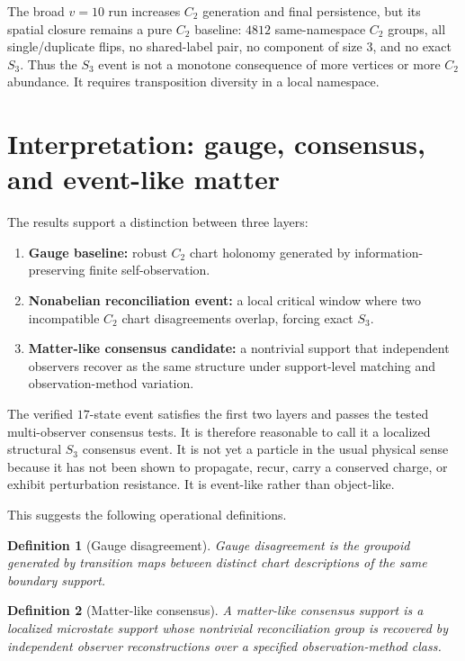 \documentclass[11pt]{article}
\newtheorem{definition}{Definition}
\begin{document}
The broad $v=10$ run increases $C_2$ generation and final persistence, but its spatial closure remains a pure $C_2$ baseline: $4812$ same-namespace $C_2$ groups, all single/duplicate flips, no shared-label pair, no component of size $3$, and no exact $S_3$.  Thus the $S_3$ event is not a monotone consequence of more vertices or more $C_2$ abundance.  It requires transposition diversity in a local namespace.

\section{Interpretation: gauge, consensus, and event-like matter}

The results support a distinction between three layers:

\begin{enumerate}
\item \textbf{Gauge baseline:} robust $C_2$ chart holonomy generated by information-preserving finite self-observation.
\item \textbf{Nonabelian reconciliation event:} a local critical window where two incompatible $C_2$ chart disagreements overlap, forcing exact $S_3$.
\item \textbf{Matter-like consensus candidate:} a nontrivial support that independent observers recover as the same structure under support-level matching and observation-method variation.
\end{enumerate}

The verified $17$-state event satisfies the first two layers and passes the tested multi-observer consensus tests.  It is therefore reasonable to call it a localized structural $S_3$ consensus event.  It is not yet a particle in the usual physical sense because it has not been shown to propagate, recur, carry a conserved charge, or exhibit perturbation resistance.  It is event-like rather than object-like.

This suggests the following operational definitions.

\begin{definition}[Gauge disagreement]
Gauge disagreement is the groupoid generated by transition maps between distinct chart descriptions of the same boundary support.
\end{definition}

\begin{definition}[Matter-like consensus]
A matter-like consensus support is a localized microstate support whose nontrivial reconciliation group is recovered by independent observer reconstructions over a specified observation-method class.
\end{definition}
\end{document}
